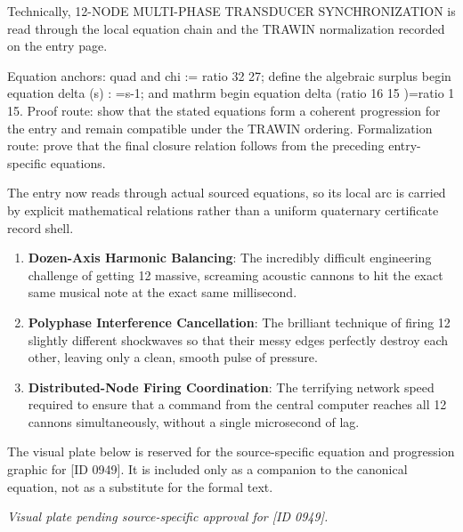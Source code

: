 Technically, 12-NODE MULTI-PHASE TRANSDUCER SYNCHRONIZATION is read through the local equation chain and the TRAWIN normalization recorded on the entry page.

Equation anchors: quad and chi := ratio 32 27; define the algebraic surplus begin equation delta (s) : =s-1; and mathrm begin equation delta (ratio 16 15 )=ratio 1 15. Proof route: show that the stated equations form a coherent progression for the entry and remain compatible under the TRAWIN ordering. Formalization route: prove that the final closure relation follows from the preceding entry-specific equations.

The entry now reads through actual sourced equations, so its local arc is carried by explicit mathematical relations rather than a uniform quaternary certificate record shell.
\endgroup

\begin{enumerate}[leftmargin=1.6em,itemsep=6pt,topsep=4pt]
\item \textbf{Dozen-Axis Harmonic Balancing}: The incredibly difficult engineering challenge of getting 12 massive, screaming acoustic cannons to hit the exact same musical note at the exact same millisecond.
\item \textbf{Polyphase Interference Cancellation}: The brilliant technique of firing 12 slightly different shockwaves so that their messy edges perfectly destroy each other, leaving only a clean, smooth pulse of pressure.
\item \textbf{Distributed-Node Firing Coordination}: The terrifying network speed required to ensure that a command from the central computer reaches all 12 cannons simultaneously, without a single microsecond of lag.
\end{enumerate}

\begingroup\footnotesize\sloppy
The visual plate below is reserved for the source-specific equation and progression graphic for [ID 0949]. It is included only as a companion to the canonical equation, not as a substitute for the formal text.
\par\endgroup
\begingroup\footnotesize\itshape
Visual plate pending source-specific approval for [ID 0949].
\par\endgroup

